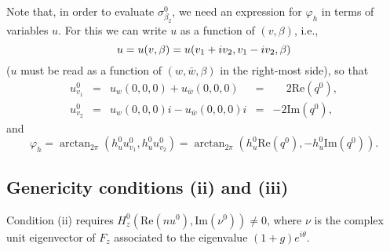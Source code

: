 \documentclass[final,onefignum]{siamltex}
\begin{document}
Note that, in order to evaluate $\sigma_{\beta_2}^0$, we need an expression
for $\varphi_h$ in terms of variables $u$. For this we can write $u$ as a function of $(v,\beta)$, i.e.,
$$
u=u(v,\beta)=u(v_1+iv_2,v_1-iv_2,\beta)\\
$$
($u$ must be read as a function of $(w,\bar{w},\beta)$ in the right-most side),
so that
$$
\begin{array}{rcccl}
u_{v_1}^0 & = &
u_{w}(0,0,0)+u_{\bar{w}}(0,0,0) & = &
\phantom{-}2\mathrm{Re}(q^0),\\
u_{v_2}^0 & = &
u_{w}(0,0,0)i-u_{\bar{w}}(0,0,0)i & = & -2\mathrm{Im}(q^0),
\end{array}
$$
and
$$
\varphi_h=\arctan_{2\pi}\left(h_u^0u_{v_1}^0,h_u^0u_{v_2}^0\right)=
\arctan_{2\pi}\left(h_u^0\mathrm{Re}(q^0),-h_u^0\mathrm{Im}(q^0)\right).
$$

\subsection{Genericity conditions (ii) and (iii)}
Condition (ii) requires $H_z^0\left(\mathrm{Re}(nu^0),\mathrm{Im}(\nu^0)\right)\neq0$, where $\nu$ is the complex unit eigenvector of $F_z$ associated to the eigenvalue $(1+g)e^{i\theta}$.
\end{document}
